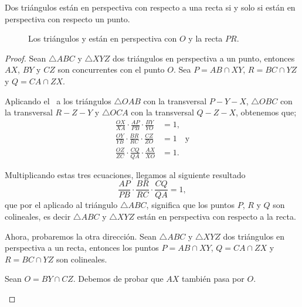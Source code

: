 \begin{section-theorem.tcb}
    Dos triángulos están en perspectiva con respecto a una recta si y solo si están en perspectiva con respecto un punto.
\end{section-theorem.tcb}
\begin{figure}[H]
    \centering
    
    \caption{Los triángulos  y  están en perspectiva con $O$ y la recta $PR$.}
\end{figure}
\begin{proof}
    Sean $\triangle ABC$ y $\triangle XYZ$ dos triángulos en perspectiva a un punto, entonces $AX$, $BY$ y $CZ$ son concurrentes con el punto $O$.
    Sea $P = AB \cap XY$, $R = BC \cap YZ$ y $Q = CA \cap ZX$.
    \begin{multicols}{2}
    \begin{figure}[H]
        \centering
        
    \end{figure}
    Aplicando el~ a los triángulos $\triangle OAB$ con la transversal $P - Y - X$, $\triangle OBC$ con la transversal $R - Z - Y$ y $\triangle OCA$ con la transversal $Q - Z - X$, obtenemos que;
    \begin{align*}
        \frac{OX}{XA} \cdot \frac{AP}{PB} \cdot \frac{BY}{YO} &= 1,\\[1mm]
        \frac{OY}{YB} \cdot \frac{BR}{RC} \cdot \frac{CZ}{ZO} &= 1\quad \text{y}\\[1mm]
        \frac{OZ}{ZC} \cdot \frac{CQ}{QA} \cdot \frac{AX}{XO} &= 1.
    \end{align*}
    \end{multicols}
    Multiplicando estas tres ecuaciones, llegamos al siguiente resultado
    \[
        \frac{AP}{PB} \cdot \frac{BR}{RC} \cdot \frac{CQ}{QA} = 1,
    \]
    que por el  aplicado al triángulo $\triangle ABC$, significa que los puntos $P$, $R$ y $Q$ son colineales, es decir $\triangle ABC$ y $\triangle XYZ$ están en perspectiva con respecto a la recta.

    Ahora, probaremos la otra dirección.
    Sean $\triangle ABC$ y $\triangle XYZ$ dos triángulos en perspectiva a un recta, entonces los puntos $P = AB \cap XY$, $Q = CA \cap ZX$ y $R = BC \cap YZ$ son colineales.
    \begin{multicols}{2}
    \begin{figure}[H]
        \centering
        
    \end{figure}
    Sean $O = BY \cap CZ$.
    Debemos de probar que $AX$ también pasa por $O$.


\end{multicols}
\end{proof}
